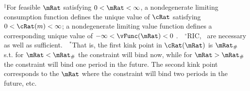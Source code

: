 \begin{table}
\parbox{\TableWidth}{\footnotesize         $^{\ddagger}$For feasible $\mRat$ satisfying $0 < \mRat < \infty$, a nondegenerate limiting consumption function defines the unique value of $\cRat$ satisfying $0 < \cRat(m) < \infty$; a nondegenerate limiting value function defines a corresponding unique value of $-\infty < \vFunc(\mRat) < 0$ .~~$^{\circ}$RIC, \FHWC~are necessary as well as sufficient.~~$^{\ast}$That is, the first kink point in $\cRat(\mRat)$ is $\mRat_{\#}$ s.t. for $\mRat < \mRat_{\#}$ the constraint will bind now, while for $\mRat > \mRat_{\#}$ the constraint will bind one period in the future.  The second kink point corresponds to the $\mRat$ where the constraint will bind two periods in the future, etc.} %
\end{table}

